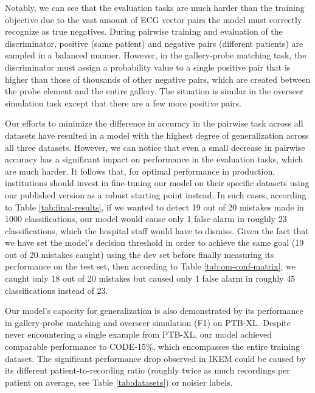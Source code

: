 \documentclass[preprint,12pt]{elsarticle}
\begin{document}
Notably, we can see that the evaluation tasks are much harder than the training objective due to the vast amount of ECG vector pairs the model must correctly recognize as true negatives. During pairwise training and evaluation of the discriminator, positive (same patient) and negative pairs (different patients) are sampled in a balanced manner. However, in the gallery-probe matching task, the discriminator must assign a probability value to a single positive pair that is higher than those of thousands of other negative pairs, which are created between the probe element and the entire gallery. The situation is similar in the overseer simulation task except that there are a few more positive pairs.

Our efforts to minimize the difference in accuracy in the pairwise task across all datasets have resulted in a model with the highest degree of generalization across all three datasets. However, we can notice that even a small decrease in pairwise accuracy has a significant impact on performance in the evaluation tasks, which are much harder. It follows that, for optimal performance in production, institutions should invest in fine-tuning our model on their specific datasets using our published version as a robust starting point instead. In such cases, according to Table \ref{tab:final-results}, if we wanted to detect 19 out of 20 mistakes made in 1000 classifications, our model would cause only 1 false alarm in roughly 23 classifications, which the hospital staff would have to dismiss.  Given the fact that we have set the model's decision threshold in order to achieve the same goal (19 out of 20 mistakes caught) using the dev set before finally measuring its performance on the test set, then according to Table \ref{tab:om-conf-matrix}, we caught only 18 out of 20 mistakes but caused only 1 false alarm in roughly 45 classifications instead of 23.

Our model's capacity for generalization is also demonstrated by its performance in gallery-probe matching and overseer simulation (F1) on PTB-XL. Despite never encountering a single example from PTB-XL, our model achieved comparable performance to CODE-15\%, which encompasses the entire training dataset. The significant performance drop observed in IKEM could be caused by its different patient-to-recording ratio (roughly twice as much recordings per patient on average, see Table \ref{tab:datasets}) or noisier labels.
\end{document}
